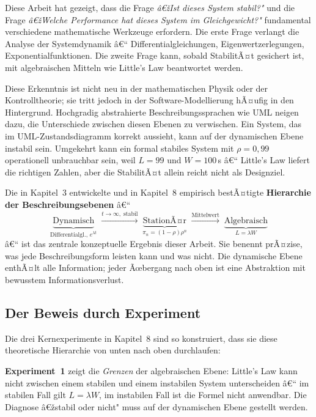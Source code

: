 ﻿\documentclass[a4paper,12pt]{report}
\theoremstyle{definition}
\begin{document}
Diese Arbeit hat gezeigt, dass die Frage \emph{â€žIst dieses System stabil?"}
und die Frage \emph{â€žWelche Performance hat dieses System im Gleichgewicht?"}
fundamental verschiedene mathematische Werkzeuge erfordern.  Die erste Frage
verlangt die Analyse der Systemdynamik â€“ Differentialgleichungen,
Eigenwertzerlegungen, Exponentialfunktionen.  Die zweite Frage kann, sobald
StabilitÃ¤t gesichert ist, mit algebraischen Mitteln wie Little's Law
beantwortet werden.

Diese Erkenntnis ist nicht neu in der mathematischen Physik oder der
Kontrolltheorie; sie tritt jedoch in der Software-Modellierung hÃ¤ufig in
den Hintergrund.  Hochgradig abstrahierte Beschreibungssprachen wie UML
neigen dazu, die Unterschiede zwischen diesen Ebenen zu verwischen.
Ein System, das im UML-Zustandsdiagramm korrekt aussieht, kann auf der
dynamischen Ebene instabil sein.  Umgekehrt kann ein formal stabiles System
mit $\rho = 0{,}99$ operationell unbrauchbar sein, weil $L = 99$ und
$W = 100$\,s â€“ Little's Law liefert die richtigen Zahlen, aber die StabilitÃ¤t
allein reicht nicht als Designziel.

Die in Kapitel~3 entwickelte und in Kapitel~8 empirisch bestÃ¤tigte
\textbf{Hierarchie der Beschreibungsebenen} â€“
\[
\underbrace{\text{Dynamisch}}_{\text{Differentialgl., } e^{\lambda t}}
\;\xrightarrow{t \to \infty,\;\text{stabil}}\;
\underbrace{\text{StationÃ¤r}}_{\pi_n = (1-\rho)\rho^n}
\;\xrightarrow{\text{Mittelwert}}\;
\underbrace{\text{Algebraisch}}_{L = \lambda W}
\]
â€“ ist das zentrale konzeptuelle Ergebnis dieser Arbeit.  Sie benennt prÃ¤zise,
was jede Beschreibungsform leisten kann und was nicht.  Die dynamische Ebene
enthÃ¤lt alle Information; jeder Ãœbergang nach oben ist eine Abstraktion mit
bewusstem Informationsverlust.

\subsection{Der Beweis durch Experiment}

Die drei Kernexperimente in Kapitel~8 sind so konstruiert, dass sie
diese theoretische Hierarchie von unten nach oben durchlaufen:

\textbf{Experiment~1} zeigt die \emph{Grenzen} der algebraischen Ebene:
Little's Law kann nicht zwischen einem stabilen und einem instabilen System
unterscheiden â€“ im stabilen Fall gilt $L = \lambda W$, im instabilen Fall
ist die Formel nicht anwendbar.  Die Diagnose â€žstabil oder nicht" muss auf
der dynamischen Ebene gestellt werden.
\end{document}
